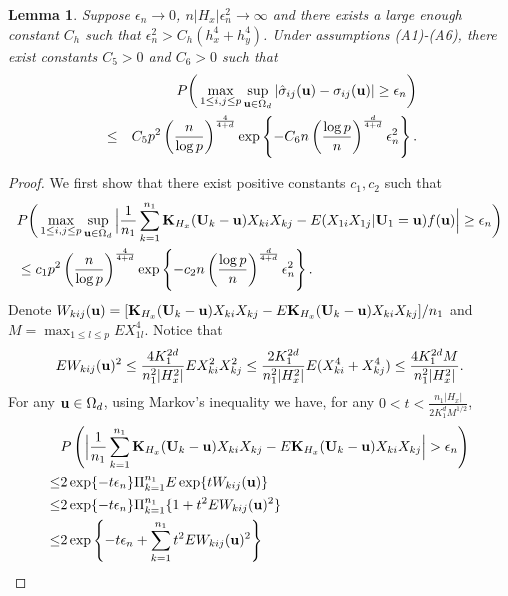 \documentclass[11pt]{article}
\newtheorem{lem}{Lemma}
\theoremstyle{definition}
\begin{document}
 
 \begin{lem}\label{covariance}
 	Suppose $\epsilon_n\rightarrow 0$, $n|H_x|\epsilon_n^2\rightarrow \infty$ and there exists a large enough constant $C_h$ such that $\epsilon^2_n>C_h(h_x^4+h_y^4)$. Under assumptions (A1)-(A6), there exist constants $C_5>0$ and $C_6>0$ such that
 	\begin{eqnarray*}
 		&&P\bigg(\max_{1\leq i,j\leq p}\sup_{{\bf u}\in \Omega_d}|\hat{\sigma}_{ij}({\bf u})-\sigma_{ij}({\bf u})|\geq \epsilon_n\bigg)\\
 		&\leq& C_5p^2\left(\frac{n}{\log p}\right)^{\frac{4}{4+d}}\exp\left\{-C_6n \left(\frac{\log p}{n}\right)^{\frac{d}{4+d}}\epsilon_n^2\right\}.
 	\end{eqnarray*}
 \end{lem}
 \begin{proof}
 	We first show that there exist positive constants $c_1, c_2$ such that
 	\begin{align}\label{lemma3.1}
 		&P\bigg(\max_{1\leq i,j\leq p}\sup_{{\bf u}\in \Omega_d}\Big|\frac{1}{n_1}\sum_{k=1}^{n_1}{\bf K}_{H_x}({\bf U}_k-{\bf u})X_{ki}X_{kj}-E(X_{1i}X_{1j}|{\bf U}_1={\bf u})f({\bf u})\Big|\geq \epsilon_n\bigg)      \\
 		&\leq c_1p^2\left(\frac{n}{\log p}\right)^{\frac{4}{4+d}}\exp\left\{-c_2n \left(\frac{\log p}{n}\right)^{\frac{d}{4+d}}\epsilon_n^2\right\}. \nonumber
 	\end{align}
 	Denote $W_{kij}({\bf u})=[{\bf K}_{H_x}({\bf U}_k-{\bf u})X_{ki}X_{kj}-E{\bf K}_{H_x}({\bf U}_k-{\bf u})X_{ki}X_{kj}]/n_1$ and $M=\max_{1\leq l\leq p}EX_{1l}^4$. Notice that
 	\begin{eqnarray*}
 		EW_{kij}({\bf u})^2\leq \frac{4{ K}_1^{2d}}{n_1^2|H_x^2|}EX_{ki}^2X_{kj}^2\leq  \frac{2K_1^{2d}}{n_1^2|H_x^2|}E(X_{ki}^4+X_{kj}^4)\leq \frac{4K_1^{2d}M}{n_1^2|H_x^2|}.
 	\end{eqnarray*}
 	For any ${\bf u}\in \Omega_d$, using Markov's inequality we have, for any $0<t<\frac{n_1|H_x|}{2K_1^dM^{1/2}}$,
 	\begin{align}\label{lemma3.2}
 		&P\left(\Big|\frac{1}{n_1}\sum_{k=1}^{n_1}{\bf K}_{H_x}({\bf U}_k-{\bf u})X_{ki}X_{kj}-E{\bf K}_{H_x}({\bf U}_k-{\bf u})X_{ki}X_{kj}\Big|>\epsilon_n \right)   \\
 		\leq&  2 \exp\{-t\epsilon_n\}\Pi_{k=1}^{n_1}E  \exp\{tW_{kij}({\bf u})\}       \nonumber\\
 		\leq& 2 \exp\{-t\epsilon_n\}\Pi_{k=1}^{n_1}\{1+t^2EW_{kij}({\bf u})^2 \}  \nonumber\\
 		\leq& 2\exp\left\{-t\epsilon_n+\sum_{k=1}^{n_1}t^2E W_{kij}({\bf u})^2\right\} \nonumber\\

\end{align}
\end{proof}
\end{document}
